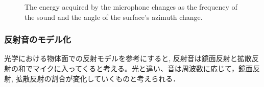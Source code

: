 \begin{figure}[t]
    \centering
    \caption{The energy acquired by the microphone changes as the frequency of the sound and the angle of the surface's azimuth change.}
    \label{fig:freq&normal}
\end{figure}

\clearpage

\subsubsection{反射音のモデル化}
\label{sec:light_model}
光学における物体面での反射モデルを参考にすると, 反射音は鏡面反射と拡散反射の和でマイクに入ってくると考える。光と違い、音は周波数に応じて，鏡面反射, 拡散反射の割合が変化していくものと考えられる．

